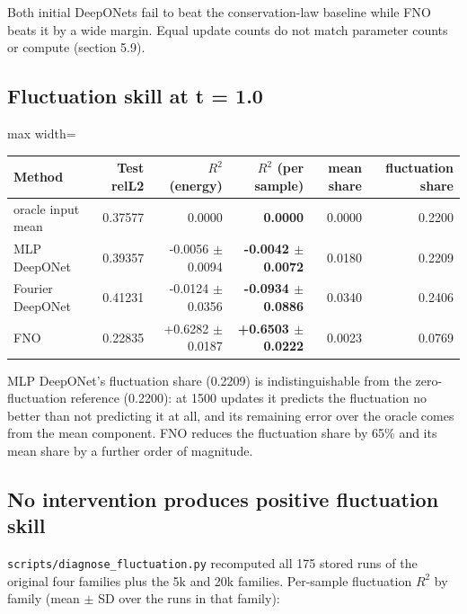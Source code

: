 \documentclass[preprint,12pt]{elsarticle}
\begin{document}
Both initial DeepONets fail to beat the conservation-law baseline while FNO beats it by a wide margin. Equal update counts do not match parameter counts or compute (section 5.9).

\subsection{Fluctuation skill at t = 1.0}

\begin{center}
\begin{adjustbox}{max width=\linewidth}
\small
\begin{tabular}{lrrrrr}
\toprule
Method & Test relL2 & $R^2$ (energy) & \textbf{$R^2$ (per sample)} & mean share & fluctuation share \\
\midrule
oracle input mean & 0.37577 & 0.0000 & \textbf{0.0000} & 0.0000 & 0.2200 \\
MLP DeepONet & 0.39357 & -0.0056 $\pm$ 0.0094 & \textbf{-0.0042 $\pm$ 0.0072} & 0.0180 & 0.2209 \\
Fourier DeepONet & 0.41231 & -0.0124 $\pm$ 0.0356 & \textbf{-0.0934 $\pm$ 0.0886} & 0.0340 & 0.2406 \\
FNO & 0.22835 & +0.6282 $\pm$ 0.0187 & \textbf{+0.6503 $\pm$ 0.0222} & 0.0023 & 0.0769 \\
\bottomrule
\end{tabular}
\end{adjustbox}
\end{center}


MLP DeepONet's fluctuation share (0.2209) is indistinguishable from the zero-fluctuation reference (0.2200): at 1500 updates it predicts the fluctuation no better than not predicting it at all, and its remaining error over the oracle comes from the mean component. FNO reduces the fluctuation share by 65\% and its mean share by a further order of magnitude.

\subsection{No intervention produces positive fluctuation skill}

\texttt{scripts/diagnose\_fluctuation.py} recomputed all 175 stored runs of the original four families plus the 5k and 20k families. Per-sample fluctuation $R^2$ by family (mean $\pm$ SD over the runs in that family):
\end{document}
